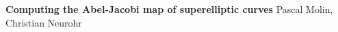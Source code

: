 \documentclass[11pt,a4paper]{article}
\def\biblio{}
\begin{document}
\def\biblio{}

\tableofcontents
\newpage

\begin{center}
  {\bf \huge Computing the Abel-Jacobi map of superelliptic curves} \abstandl
  Pascal Molin, Christian Neurohr
\end{center}
\newpage


















\newpage


\end{document}
